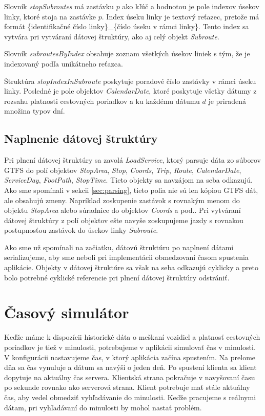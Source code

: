 Slovník \textit{stopSubroutes} má zastávku $p$ ako kľúč a hodnotou je pole indexov úsekov linky, ktoré stoja na zastávke $p$. Index úseku linky je textový reťazec, pretože má formát \{identifikačné číslo linky\}\_\{číslo úseku v rámci linky\}. Tento index sa vytvára pri vytváraní dátovej štruktúry, ako aj celý objekt \textit{Subroute}. 

Slovník \textit{subroutesByIndex} obsahuje zoznam všetkých úsekov liniek s tým, že je indexovaný podľa unikátneho reťazca.

Štruktúra \textit{stopIndexInSubroute} poskytuje poradové číslo zastávky v rámci úseku linky. Posledné je pole objektov \textit{CalendarDate}, ktoré poskytuje  všetky dátumy z rozsahu platnosti cestovných poriadkov a ku každému dátumu $d$ je priradená množina typov dní. 

\subsection{Naplnenie dátovej štruktúry}
Pri plnení dátovej štruktúry sa zavolá \textit{LoadService}, ktorý parsuje dáta zo súborov GTFS do polí objektov \textit{StopArea}, \textit{Stop}, \textit{Coords}, \textit{Trip}, \textit{Route}, \textit{CalendarDate}, \textit{ServiceDay}, \textit{FootPath}, \textit{StopTime}. Tieto objekty sa navzájom na seba odkazujú. Ako sme spomínali v sekcii \ref{sec:parsing}, tieto polia nie sú len kópiou GTFS dát, ale obsahujú zmeny. Napríklad zoskupenie zastávok s rovnakým menom do objektu \textit{StopArea} alebo súradnice do objektov \textit{Coords} a pod.. Pri vytváraní dátovej štruktúry z polí objektov ešte navyše zoskupujeme jazdy s rovnakou postupnosťou zastávok do úsekov linky \textit{Subroute}. 

Ako sme už spomínali na začiatku, dátovú štruktúru po naplnení dátami serializujeme, aby sme neboli pri implementácii obmedzovaní časom spustenia aplikácie. Objekty v dátovej štruktúre sa však na seba odkazujú cyklicky a preto bolo potrebné cyklické referencie pri plnení dátovej štruktúry odstrániť. 

\section{Časový simulátor}
Keďže máme k dispozícii historické dáta o meškaní vozidiel a platnosť cestovných poriadkov je tiež v minulosti, potrebujeme v aplikácii simulovať čas v minulosti. V konfigurácii nastavujeme čas, v ktorý aplikácia začína spustením. Na prelome dňa sa čas vynuluje a dátum sa navýši o jeden deň. 
Po spustení klienta sa klient dopytuje na aktuálny čas servera. Klientská strana pokračuje v navyšovaní času po sekunde rovnako ako serverová strana. Klient potrebuje mať stále aktuálny čas, aby vedel obmedziť vyhľadávanie do minulosti. Keďže pracujeme s reálnymi dátam, pri vyhľadávaní do minulosti by mohol nastať problém. 

